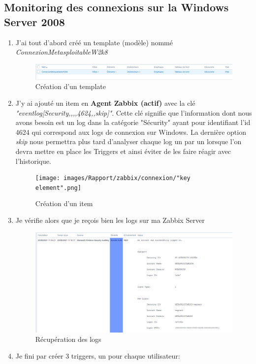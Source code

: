 \documentclass[a4paper]{article}
\begin{document}
\subsection{Monitoring des connexions sur la Windows Server 2008}
\begin{enumerate}
  \item J'ai tout d'abord créé un template (modèle) nommé \emph{ConnexionMetasploitableW2k8}
  \begin{figure}[H]
    \centering
    \includegraphics[width=16cm]{images/Rapport/zabbix/connexion/modele.png}
    \caption{Création d'un template}
  \end{figure}
  \item J'y ai ajouté un item en \textbf{Agent Zabbix (actif)} avec la clé \emph{"eventlog[Security,,,,4624,,skip]"}. 
  Cette clé signifie que l'information dont nous avons besoin est un log dans la catégorie "Sécurity" ayant pour identifiant l'id 4624 qui correspond aux logs de connexion sur Windows.
  La dernière option \emph{skip} nous permettra plus tard d'analyser chaque log un par un lorsque l'on devra mettre en place les Triggers et ainsi éviter de les faire réagir avec l'historique.
  \begin{figure}[H]
    \centering
    \texttt{[image: images/Rapport/zabbix/connexion/"key element".png]}
    \caption{Création d'un item}
  \end{figure}
  \item Je vérifie alors que je reçois bien les logs sur ma Zabbix Server
  \begin{figure}[H]
    \centering
    \includegraphics[width=12cm]{images/Rapport/zabbix/connexion/1.png}
    \caption{Récupération des logs}
  \end{figure}
  \item Je fini par créer 3 triggers, un pour chaque utilisateur:

\end{enumerate}
\end{document}
